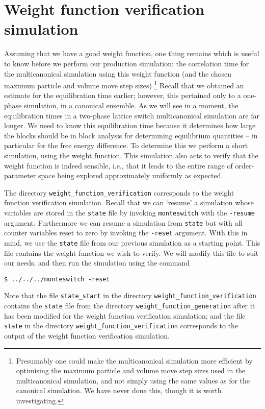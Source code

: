 \documentclass{report}
\begin{document}
\section{Weight function verification simulation}
Assuming that we have a good weight function, one thing remains which is useful to know before we perform our production simulation: the correlation time 
for the multicanonical simulation using this weight function (and the chosen maximum particle and volume move step sizes)
\footnote{Presumably one could make the multicanonical simulation more efficient by optimising the maximum particle and volume move step sizes used in the 
multicanonical simulation, and not simply using the same values as for the canonical simulation. We have never done this, though it is worth investigating.}
Recall that we obtained an estimate for the equilibration time earlier; however, this pertained only to a one-phase simulation,
in a canonical ensemble. As we will see in a moment, the equilibration times in a two-phase lattice switch multicanonical simulation are far longer. 
We need to know this equilibration time because it determines how large the blocks should be in block analysis for determining equilibrium quantities -- 
in particular for the free energy difference. To determine this we perform a short simulation, using the weight function. This simulation also acts to
verify that the weight function is indeed sensible, i.e., that it leads to the entire range of order-parameter space being explored approximately 
uniformly as expected.

The directory \texttt{weight\_function\_verification} corresponds to the weight function verification simulation.
Recall that we can `resume' a simulation whose variables are stored in the \texttt{state} file by invoking \texttt{monteswitch} with the 
\texttt{-resume} argument. Furthermore
we can resume a simulation from \texttt{state} but with all counter variables reset to zero by invoking the \texttt{-reset} argument. With this in mind, we
use the \texttt{state} file from our previous simulation as a starting point. This file contains the weight function we wish to verify. We will modify this
file to suit our needs, and then run the simulation using the command
\begin{verbatim}
$ ../../../monteswitch -reset
\end{verbatim}
Note that the file \texttt{state\_start} in the directory \texttt{weight\_function\_verification} contains the \texttt{state} file from the directory 
\texttt{weight\_function\_generation}
after it has been modified for the weight function verification simulation; and the file \texttt{state} in the directory \texttt{weight\_function\_verification}
corresponds to the output of the weight function verification simulation.
\end{document}
